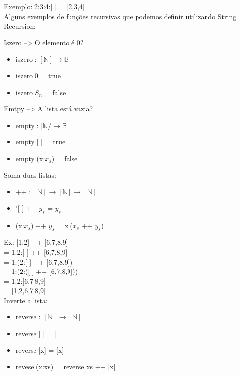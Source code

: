 \documentclass[12pt, a4paper]{article}
\begin{document}
			Exemplo: 2:3:4:[ ] = [2,3,4]\\

			Alguns exemplos de fun\c{c}\~oes recursivas que podemos definir utilizando String Recursion:

			Iszero --> O elemento \'e 0?
			\begin{itemize}
			\item iszero : $[\mathbb{N}] \rightarrow \mathbb{B}$
			\item iszero 0 = true
			\item iszero $S_n$ = false \\
			\end{itemize}

			Emtpy --> A lista est\'a vazia?
			\begin{itemize}
			\item empty : $[\mathbb{N}/ \rightarrow \mathbb{B}$
			\item empty [ ] = true
			\item empty (x:$x_s$) = false\\
			\end{itemize}

			Soma duas listas:
			\begin{itemize}
			\item ++ : $[\mathbb{N}] \rightarrow [\mathbb{N}] \rightarrow [\mathbb{N}] $
			\item '[ ] ++ $y_s$ = $y_s$
			\item (x:$x_s$) ++ $y_s$ = x:($x_s$ ++ $y_s$)\\
			\end{itemize}
			Ex: [1,2] ++ [6,7,8,9]\\
			= 1:2:[ ] ++ [6,7,8,9]\\
			= 1:(2:[ ] ++ [6,7,8,9])\\
			= 1:(2:([ ] ++ [6,7,8,9]))\\
			= 1:2:[6,7,8,9]\\
			= [1,2,6,7,8,9]\\

			Inverte a lista:
			\begin{itemize}
			\item reverse : $[\mathbb{N}] \rightarrow [\mathbb{N}] $
			\item reverse [ ] = [ ]
			\item reverse [x] = [x]
			\item revese (x:xs) = reverse xs ++ [x]\\
			\end{itemize}
\end{document}
